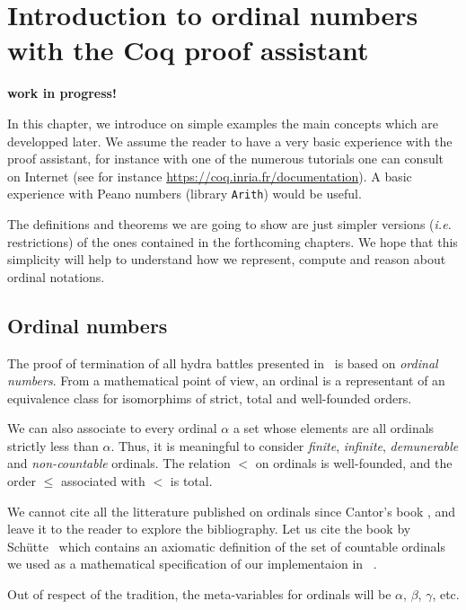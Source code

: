 \chapter{Introduction to ordinal numbers with the Coq proof assistant}

\centerline{\LARGE {\bf work in progress!}}




In this chapter, we introduce on  simple examples the main concepts which are developped later.  We assume the reader to have a very basic experience with the \coq{} proof assistant, for instance with one of the numerous tutorials one can consult on Internet
(see for instance \url{https://coq.inria.fr/documentation}). A basic experience  with Peano numbers (library \texttt{Arith}) would be useful.

The definitions  and theorems we are going to show are just simpler versions (\emph{i.e.} restrictions) of the ones contained in the forthcoming chapters. We hope that this simplicity will help to understand how we represent, compute and reason about ordinal notations.



\section{Ordinal numbers}

The proof of termination of all hydra battles presented in~\cite{KP82} is based
on \emph{ordinal numbers}.
From a mathematical point of view, an ordinal is a representant of an equivalence class for isomorphims of strict, total and well-founded orders.

We can also associate to every ordinal $\alpha$ a set whose elements are all ordinals strictly less than $\alpha$. Thus, it is meaningful  to consider \emph{finite}, \emph{infinite}, \emph{demunerable} and \emph{non-countable} ordinals.
The relation $<$ on ordinals is well-founded, and the order $\leq$ associated with
$<$ is total.

We cannot cite all the litterature published on ordinals since Cantor's book 
\cite{cantorbook}, and 
leave it to the reader to explore the bibliography. Let us cite the book by Schütte~\cite{schutte} which contains an axiomatic definition of the set of countable ordinals we used as a mathematical specification of our implementaion in \coq{}~\cite{CantorContrib}. 


Out of respect of the tradition, the meta-variables for ordinals will be 
 $\alpha$, $\beta$, $\gamma$, etc. 


